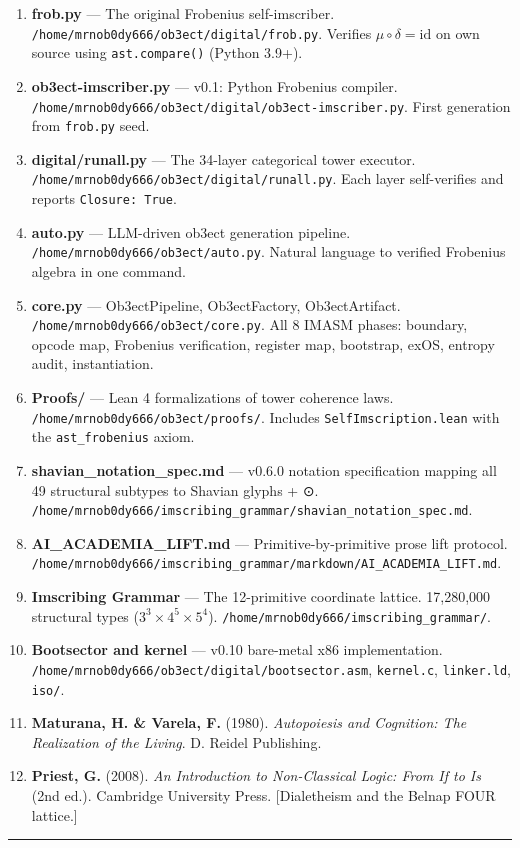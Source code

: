 \documentclass[12pt,a4paper]{article}
\begin{document}
\begin{enumerate}
    \item \textbf{frob.py} --- The original Frobenius self-imscriber. \texttt{/home/mrnob0dy666/ob3ect/digital/frob.py}. Verifies $\mu\circ\delta = \mathrm{id}$ on own source using \texttt{ast.compare()} (Python 3.9+).
    \item \textbf{ob3ect-imscriber.py} --- v0.1: Python Frobenius compiler. \texttt{/home/mrnob0dy666/ob3ect/digital/ob3ect-imscriber.py}. First generation from \texttt{frob.py} seed.
    \item \textbf{digital/runall.py} --- The 34-layer categorical tower executor. \texttt{/home/mrnob0dy666/ob3ect/digital/runall.py}. Each layer self-verifies and reports \texttt{Closure: True}.
    \item \textbf{auto.py} --- LLM-driven ob3ect generation pipeline. \texttt{/home/mrnob0dy666/ob3ect/auto.py}. Natural language to verified Frobenius algebra in one command.
    \item \textbf{core.py} --- Ob3ectPipeline, Ob3ectFactory, Ob3ectArtifact. \texttt{/home/mrnob0dy666/ob3ect/core.py}. All 8 IMASM phases: boundary, opcode map, Frobenius verification, register map, bootstrap, exOS, entropy audit, instantiation.
    \item \textbf{Proofs/} --- Lean 4 formalizations of tower coherence laws. \texttt{/home/mrnob0dy666/ob3ect/proofs/}. Includes \texttt{SelfImscription.lean} with the \texttt{ast\_frobenius} axiom.
    \item \textbf{shavian\_notation\_spec.md} --- v0.6.0 notation specification mapping all 49 structural subtypes to Shavian glyphs + ⊙. \texttt{/home/mrnob0dy666/imscribing\_grammar/shavian\_notation\_spec.md}.
    \item \textbf{AI\_ACADEMIA\_LIFT.md} --- Primitive-by-primitive prose lift protocol. \texttt{/home/mrnob0dy666/imscribing\_grammar/markdown/AI\_ACADEMIA\_LIFT.md}.
    \item \textbf{Imscribing Grammar} --- The 12-primitive coordinate lattice. 17,280,000 structural types ($3^3 \times 4^5 \times 5^4$). \texttt{/home/mrnob0dy666/imscribing\_grammar/}.
    \item \textbf{Bootsector and kernel} --- v0.10 bare-metal x86 implementation. \texttt{/home/mrnob0dy666/ob3ect/digital/bootsector.asm}, \texttt{kernel.c}, \texttt{linker.ld}, \texttt{iso/}.
    \item \textbf{Maturana, H. \& Varela, F.} (1980). \emph{Autopoiesis and Cognition: The Realization of the Living}. D. Reidel Publishing.
    \item \textbf{Priest, G.} (2008). \emph{An Introduction to Non-Classical Logic: From If to Is} (2nd ed.). Cambridge University Press. {[}Dialetheism and the Belnap FOUR lattice.{]}
\end{enumerate}

\begin{center}
\rule{0.5\textwidth}{0.4pt}
\end{center}
\end{document}

